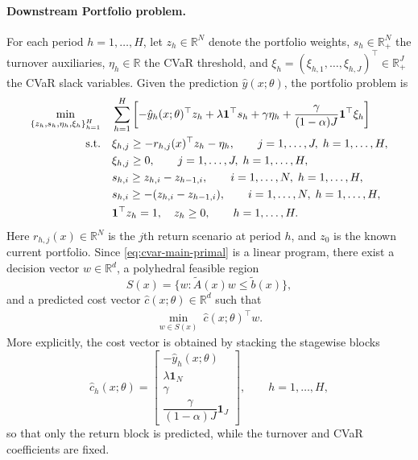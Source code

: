 \documentclass[11pt]{article}
\theoremstyle{definition}
\begin{document}
\paragraph{Downstream Portfolio problem.}
For each period $h=1,\dots,H$, let $z_h\in\mathbb R^N$ denote the portfolio
weights, $s_h\in\mathbb R_+^N$ the turnover auxiliaries,
$\eta_h\in\mathbb R$ the CVaR threshold, and
$\xi_h=(\xi_{h,1},\dots,\xi_{h,J})^\top\in\mathbb R_+^J$ the CVaR slack
variables. Given the prediction $\hat y(x;\theta)$, the portfolio problem is
\begin{align}
\min_{\{z_h,s_h,\eta_h,\xi_h\}_{h=1}^H}
\quad
& \sum_{h=1}^H\left[
-\hat y_h(x;\theta)^\top z_h
+\lambda \mathbf 1^\top s_h
+\gamma \eta_h
+\frac{\gamma}{(1-\alpha)J}\mathbf 1^\top \xi_h
\right]
\label{eq:cvar-main-primal}
\\
\text{s.t.}\quad
& \xi_{h,j}\ge -r_{h,j}(x)^\top z_h-\eta_h,
\qquad j=1,\dots,J,\; h=1,\dots,H, \notag\\
& \xi_{h,j}\ge 0,
\qquad j=1,\dots,J,\; h=1,\dots,H, \notag\\
& s_{h,i}\ge z_{h,i}-z_{h-1,i},
\qquad i=1,\dots,N,\; h=1,\dots,H, \notag\\
& s_{h,i}\ge -(z_{h,i}-z_{h-1,i}),
\qquad i=1,\dots,N,\; h=1,\dots,H, \notag\\
& \mathbf 1^\top z_h = 1,\quad z_h\ge 0,
\qquad h=1,\dots,H. \notag
\end{align}
Here $r_{h,j}(x)\in\mathbb R^N$ is the $j$th return scenario at period $h$,
and $z_0$ is the known current portfolio.
Since \eqref{eq:cvar-main-primal} is a linear program, there exist a decision
vector $w\in\mathbb R^d$, a polyhedral feasible region
\[
S(x)=\{w:\tilde A(x)w\le \tilde b(x)\},
\]
and a predicted cost vector $\hat c(x;\theta)\in\mathbb R^d$ such that
\begin{align}
\min_{w\in S(x)}\ \hat c(x;\theta)^\top w.
\label{eq:compact-predicted-problem}
\end{align}
More explicitly, the cost vector is obtained by stacking the stagewise blocks
\[
\hat c_h(x;\theta)=
\begin{bmatrix}
-\hat y_h(x;\theta)\\
\lambda \mathbf 1_N\\
\gamma\\
\dfrac{\gamma}{(1-\alpha)J}\mathbf 1_J
\end{bmatrix},
\qquad h=1,\dots,H,
\]
so that only the return block is predicted, while the turnover and CVaR
coefficients are fixed.
\end{document}
